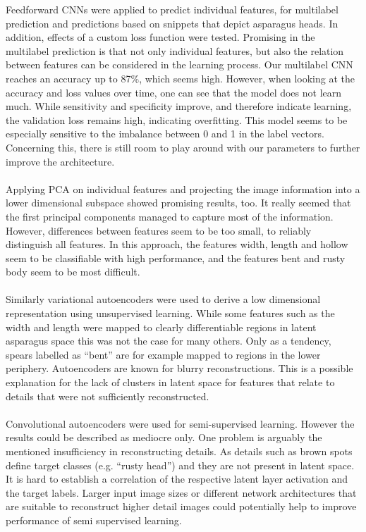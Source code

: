 Feedforward CNNs were applied to predict individual features, for multilabel prediction and predictions based on snippets that depict asparagus heads. In addition, effects of a custom loss function were tested. Promising in the multilabel prediction is that not only individual features, but also the relation between features can be considered in the learning process. Our multilabel CNN reaches an accuracy up to 87\%, which seems high. However, when looking at the accuracy and loss values over time, one can see that the model does not learn much. While sensitivity and specificity improve, and therefore indicate learning, the validation loss remains high, indicating overfitting. This model seems to be especially sensitive to the imbalance between 0 and 1 in the label vectors. Concerning this, there is still room to play around with our parameters to further improve the architecture. \\
\\
Applying PCA on individual features and projecting the image information into a lower dimensional subspace showed promising results, too. It really seemed that the first principal components managed to capture most of the information. However, differences between features seem to be too small, to reliably distinguish all features. In this approach, the features width, length and hollow seem to be classifiable with high performance, and the features bent and rusty body seem to be most difficult.  \\
\\
Similarly variational autoencoders were used to derive a low dimensional representation using unsupervised learning. While some features such as the width and length were mapped to clearly differentiable regions in latent asparagus space this was not the case for many others. Only as a tendency, spears labelled as “bent” are for example mapped to regions in the lower periphery. Autoencoders are known for blurry reconstructions. This is a possible explanation for the lack of clusters in latent space for features that relate to details that were not sufficiently reconstructed.  \\
\\
Convolutional autoencoders were used for semi-supervised learning. However the results could be described as mediocre only. One problem is arguably the mentioned insufficiency in reconstructing details. As details such as brown spots define target classes (e.g. “rusty head”) and they are not present in latent space. It is hard to establish a correlation of the respective latent layer activation and the target labels. Larger input image sizes or different network architectures that are suitable to reconstruct higher detail images could potentially help to improve performance of semi supervised learning. \\
